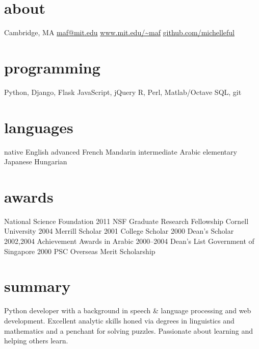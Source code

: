 \documentclass[]{friggeri-cv}
\begin{document}


\begin{aside}
  \section{about}
	Cambridge, MA
    \href{mailto:maf@mit.edu}{maf@mit.edu}
    \href{http://www.mit.edu/~maf}{www.mit.edu/\textasciitilde maf}
    \href{http://github.com/michelleful}{github.com/michelleful}
  \section{programming}
    Python, Django, Flask
    JavaScript, jQuery
	R, Perl, Matlab/Octave
	SQL, git
  \section{languages}
	{\footnotesize{}native} English
	{\footnotesize{}advanced} French
	         Mandarin
	{\footnotesize{}intermediate} Arabic
	{\footnotesize{}elementary} Japanese
	           Hungarian
  \section{awards}
    {\footnotesize{}National Science Foundation}
    {\footnotesize{}2011} NSF Graduate Research Fellowship
    {\footnotesize{}Cornell University} 
    {\footnotesize{}2004} Merrill Scholar
    {\footnotesize{}2001} College Scholar
    {\footnotesize{}2000} Dean's Scholar
    {\footnotesize{}2002,2004} Achievement Awards in Arabic
    {\footnotesize{}2000--2004} Dean's List
    {\footnotesize{}Government of Singapore}
    {\footnotesize{}2000} PSC Overseas Merit Scholarship 
\end{aside}

\section{summary}

Python developer with a background in speech \& language processing and web development. Excellent analytic skills honed via degrees in linguistics and mathematics and a penchant for solving puzzles.
Passionate about learning and helping others learn.
\end{document}
